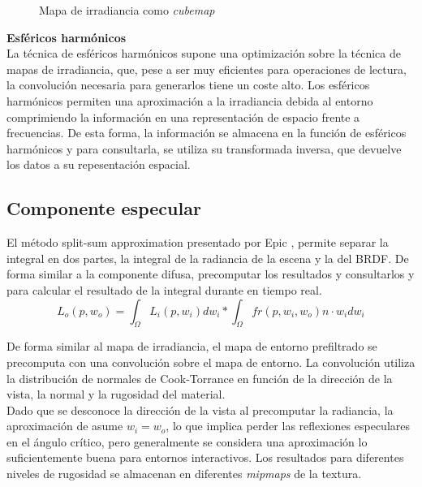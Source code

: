             \begin{figure}[H]
                \vspace{0.5cm}
                \centering
                \caption{Mapa de irradiancia como \textit{cubemap}}
            \end{figure}
            \singlespacing

            \textbf{Esf\'ericos harm\'onicos}\\
            La t\'ecnica de esf\'ericos harm\'onicos \autocite{sh} supone una optimizaci\'on sobre la t\'ecnica de mapas de irradiancia,
            que, pese a ser muy eficientes para operaciones de lectura, la convoluci\'on necesaria para generarlos tiene un coste alto.
            Los esf\'ericos harm\'onicos permiten una aproximaci\'on a la irradiancia debida al entorno comprimiendo la informaci\'on
            en una representaci\'on de espacio frente a frecuencias. De esta forma, la informaci\'on se almacena en la funci\'on de
            esf\'ericos harm\'onicos y para consultarla, se utiliza su transformada inversa, que devuelve los datos a su repesentaci\'on espacial.


        \subsection{Componente especular}
        El m\'etodo split-sum approximation presentado por Epic \autocite{karis}, permite separar la integral en dos partes, la integral de
        la radiancia de la escena y la del BRDF. De forma similar a la componente difusa, precomputar los resultados y consultarlos y para
        calcular el resultado de la integral durante en tiempo real.\\
        
        \singlespacing
        \begin{equation}
            L_o(p, w_o) =
            \int_{\Omega}L_i(p, w_i)dw_i * \int_{\Omega}fr(p, w_i, w_o) n\cdot{w_i}dw_i
        \end{equation}
        \singlespacing

        De forma similar al mapa de irradiancia, el mapa de entorno prefiltrado se precomputa con una convoluci\'on sobre el mapa
        de entorno. La convoluci\'on utiliza la distribuci\'on de normales de Cook-Torrance \autocite{cooktorrance} en funci\'on
        de la direcci\'on de la vista, la normal y la rugosidad del material.\\
        Dado que se desconoce la direcci\'on de la vista al precomputar la radiancia, la aproximaci\'on de asume $w_i = w_o$, lo que implica perder las
        reflexiones especulares en el \'angulo cr\'itico, pero generalmente se considera una aproximaci\'on lo suficientemente buena para entornos
        interactivos. Los resultados para diferentes niveles de rugosidad se almacenan en diferentes \textit{mipmaps} de la textura.\\

